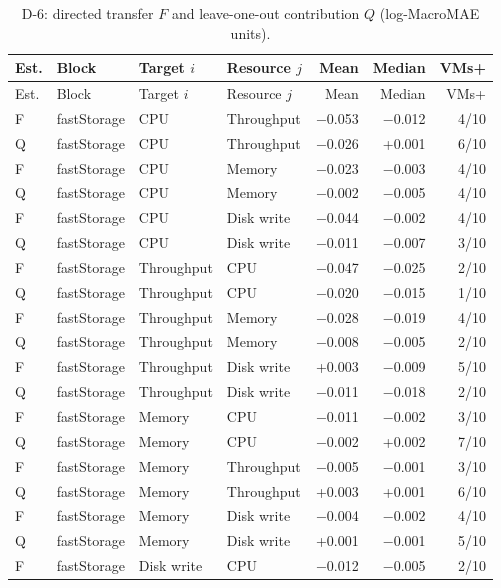 \footnotesize
\setlength{\tabcolsep}{3pt}
\begin{longtable}{@{}llllrrr@{}}
\caption{D-6: directed transfer $F$ and leave-one-out contribution $Q$ (log-MacroMAE units).}\label{tab:supp-t2-d6}\\
\toprule
Est. & Block & Target $i$ & Resource $j$ & Mean & Median & VMs+ \\
\midrule
\endfirsthead
\toprule
Est. & Block & Target $i$ & Resource $j$ & Mean & Median & VMs+ \\
\midrule
\endhead
\bottomrule
\endfoot
F & fastStorage & CPU & Throughput & $-$0.053 & $-$0.012 & 4/10 \\
Q & fastStorage & CPU & Throughput & $-$0.026 & +0.001 & 6/10 \\
F & fastStorage & CPU & Memory & $-$0.023 & $-$0.003 & 4/10 \\
Q & fastStorage & CPU & Memory & $-$0.002 & $-$0.005 & 4/10 \\
F & fastStorage & CPU & Disk write & $-$0.044 & $-$0.002 & 4/10 \\
Q & fastStorage & CPU & Disk write & $-$0.011 & $-$0.007 & 3/10 \\
F & fastStorage & Throughput & CPU & $-$0.047 & $-$0.025 & 2/10 \\
Q & fastStorage & Throughput & CPU & $-$0.020 & $-$0.015 & 1/10 \\
F & fastStorage & Throughput & Memory & $-$0.028 & $-$0.019 & 4/10 \\
Q & fastStorage & Throughput & Memory & $-$0.008 & $-$0.005 & 2/10 \\
F & fastStorage & Throughput & Disk write & +0.003 & $-$0.009 & 5/10 \\
Q & fastStorage & Throughput & Disk write & $-$0.011 & $-$0.018 & 2/10 \\
F & fastStorage & Memory & CPU & $-$0.011 & $-$0.002 & 3/10 \\
Q & fastStorage & Memory & CPU & $-$0.002 & +0.002 & 7/10 \\
F & fastStorage & Memory & Throughput & $-$0.005 & $-$0.001 & 3/10 \\
Q & fastStorage & Memory & Throughput & +0.003 & +0.001 & 6/10 \\
F & fastStorage & Memory & Disk write & $-$0.004 & $-$0.002 & 4/10 \\
Q & fastStorage & Memory & Disk write & +0.001 & $-$0.001 & 5/10 \\
F & fastStorage & Disk write & CPU & $-$0.012 & $-$0.005 & 2/10 \\

\end{longtable}
